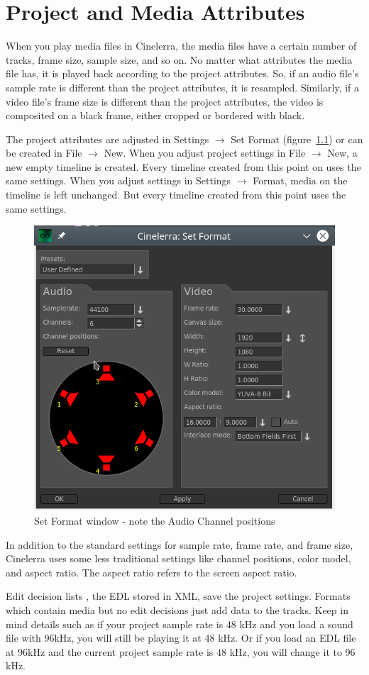 \chapter{Project and Media Attributes}%
\label{cha:project_and_media_attributes}

When you play media files in Cinelerra, the media files have a certain number of tracks, frame size, sample size, and so on. No matter what attributes the media file has, it is played back according to the project attributes. So, if an audio file's sample rate is different than the project attributes, it is resampled. Similarly, if a video file's frame size is different than the project attributes, the video is composited on a black frame, either cropped or bordered with black.

The project attributes are adjusted in Settings $\rightarrow$ Set Format (figure~\ref{fig:set-format}) or can be created in File $\rightarrow$ New. When you adjust project settings in File $\rightarrow$ New, a new empty timeline is created. Every timeline created from this point on uses the same settings. When you adjust settings in Settings $\rightarrow$ Format, media on the timeline is left unchanged. But every timeline created from this point uses the same settings.

\begin{figure}[htpb]
	\centering
	\includegraphics[width=0.5\linewidth]{images/set-format.png}
	\caption{Set Format window - note the Audio Channel positions}
	\label{fig:set-format}
\end{figure}

In addition to the standard settings for sample rate, frame rate, and frame size, Cinelerra uses some less traditional settings like channel positions, color model, and aspect ratio.  The aspect ratio refers to the screen aspect ratio.

Edit decision lists , the EDL stored in XML, save the project settings.  Formats which contain media but no edit decisions just add data to the tracks. Keep in mind details such as if your project sample rate is 48 kHz and you load a sound file with 96kHz, you will still be playing it at 48 kHz.  Or if you load an EDL file at 96kHz and the current project sample rate is 48 kHz, you will change it to 96 kHz.

